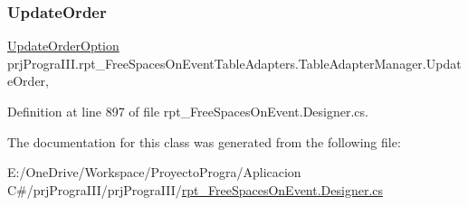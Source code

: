 \subsubsection{\texorpdfstring{Update\+Order}{UpdateOrder}}
{\footnotesize\ttfamily \hyperlink{classprj_progra_i_i_i_1_1rpt___free_spaces_on_event_table_adapters_1_1_table_adapter_manager_a9cfd63ba078114fdb1994cfe5f0d2eeb}{Update\+Order\+Option} prj\+Progra\+I\+I\+I.\+rpt\+\_\+\+Free\+Spaces\+On\+Event\+Table\+Adapters.\+Table\+Adapter\+Manager.\+Update\+Order\hspace{0.3cm}{\ttfamily [get]}, {\ttfamily [set]}}



Definition at line 897 of file rpt\+\_\+\+Free\+Spaces\+On\+Event.\+Designer.\+cs.



The documentation for this class was generated from the following file\+:\begin{DoxyCompactItemize}
\item 
E\+:/\+One\+Drive/\+Workspace/\+Proyecto\+Progra/\+Aplicacion C\#/prj\+Progra\+I\+I\+I/prj\+Progra\+I\+I\+I/\hyperlink{rpt___free_spaces_on_event_8_designer_8cs}{rpt\+\_\+\+Free\+Spaces\+On\+Event.\+Designer.\+cs}\end{DoxyCompactItemize}
